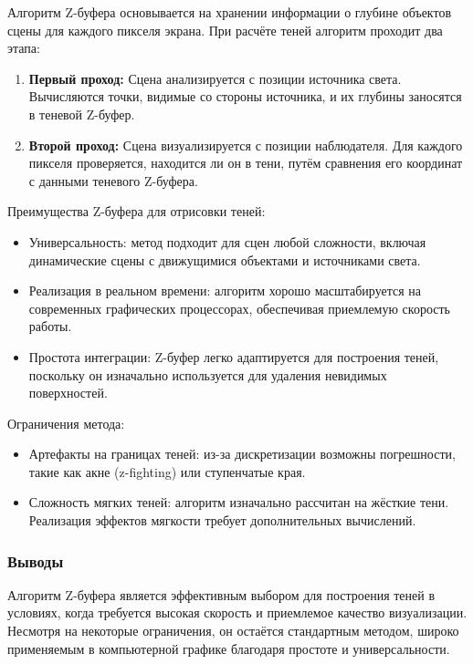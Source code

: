 \hspace{1.25cm}
Алгоритм Z-буфера основывается на хранении информации о глубине объектов сцены для каждого пикселя экрана. При расчёте теней алгоритм проходит два этапа:

\begin{enumerate}
    \item \textbf{Первый проход:} Сцена анализируется с позиции источника света. Вычисляются точки, видимые со стороны источника, и их глубины заносятся в теневой Z-буфер.
    \item \textbf{Второй проход:} Сцена визуализируется с позиции наблюдателя. Для каждого пикселя проверяется, находится ли он в тени, путём сравнения его координат с данными теневого Z-буфера.
\end{enumerate}


Преимущества Z-буфера для отрисовки теней:

\begin{itemize}
    \item Универсальность: метод подходит для сцен любой сложности, включая динамические сцены с движущимися объектами и источниками света.
    \item Реализация в реальном времени: алгоритм хорошо масштабируется на современных графических процессорах, обеспечивая приемлемую скорость работы.
    \item Простота интеграции: Z-буфер легко адаптируется для построения теней, поскольку он изначально используется для удаления невидимых поверхностей.
\end{itemize}

Ограничения метода:

\begin{itemize}
    \item Артефакты на границах теней: из-за дискретизации возможны погрешности, такие как акне (z-fighting) или ступенчатые края.
    \item Сложность мягких теней: алгоритм изначально рассчитан на жёсткие тени. Реализация эффектов мягкости требует дополнительных вычислений.
\end{itemize}


\subsubsection{Выводы}

\hspace{1.25cm}
Алгоритм Z-буфера является эффективным выбором для построения теней в условиях, когда требуется высокая скорость и приемлемое качество визуализации. Несмотря на некоторые ограничения, он остаётся стандартным методом, широко применяемым в компьютерной графике благодаря простоте и универсальности.~\cite{romanyuk_kurinnyy}





